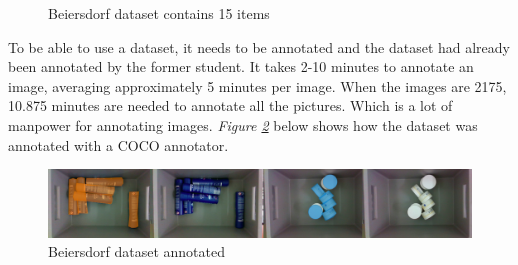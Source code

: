 \begin{figure}[h]
    \hfill
    \hfill
    \hfill
    \hfill
    \hfill
    \hfill
    \caption{Beiersdorf dataset contains 15 items\cite{bjarnason_1984-_detecting_2021}}
    \label{fig:beiersdorf}
\end{figure}
To be able to use a dataset, it needs to be annotated and the dataset had already been annotated by the former student. It takes 2-10 minutes to annotate an image, averaging approximately 5 minutes per image. When the images are 2175, 10.875 minutes are needed to annotate all the pictures. Which is a lot of manpower for annotating images. \textit{Figure \ref{fig:beiersdorfanno}} below shows how the dataset was annotated with a COCO annotator\cite{brooks_jsbrokscoco-annotator_2021}.
\begin{figure}[h]
    \centering
    \includegraphics[width=1\textwidth,  angle =0]{graphics/methods/sverrirannotated.PNG}
    \caption{Beiersdorf dataset annotated\cite{bjarnason_1984-_detecting_2021}}
    \label{fig:beiersdorfanno}
\end{figure}

